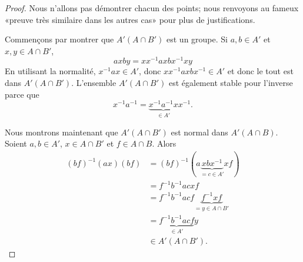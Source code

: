\begin{proof}
    Nous n'allons pas démontrer chacun des points; nous renvoyons au fameux «preuve très similaire dans les autres cas» pour plus de justifications.

    Commençons par montrer que \( A'(A\cap B')\) est un groupe. Si \( a,b\in A'\) et \( x,y\in A\cap B'\),
    \begin{equation}
        axby=xx^{-1}axbx^{-1}xy
    \end{equation}
    En utilisant la normalité, \( x^{-1}ax\in A'\), donc \( xx^{-1}axbx^{-1}\in A'\) et donc le tout est dans \( A'(A\cap B')\). L'ensemble \( A'(A\cap B')\) est également stable pour l'inverse parce que
    \begin{equation}
        x^{-1}a^{-1}=\underbrace{x^{-1}a^{-1}x}_{\in A'}x^{-1}.
    \end{equation}

    Nous montrons maintenant que \( A'(A\cap B')\) est normal dans \( A'(A\cap B)\). Soient \( a,b\in A'\), \( x\in A\cap B'\) et \( f\in A\cap B\). Alors
    \begin{subequations}
        \begin{align}
        (bf)^{-1}(ax)(bf)&=(bf)^{-1}(a\underbrace{xbx^{-1}}_{=c\in A'}xf)\\
        &=f^{-1}b^{-1}acxf\\
        &=f^{-1}b^{-1}acf\underbrace{f^{-1}xf}_{=y\in A\cap B'}\\
        &=\underbrace{f^{-1}b^{-1}acf}_{\in A'}y\\
        &\in A'(A\cap B').
        \end{align}
    \end{subequations}


\end{proof}
